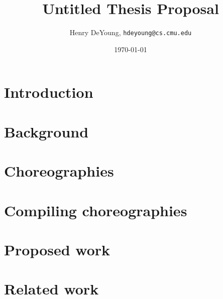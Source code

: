 \documentclass{article}
\begin{document}
\title{Untitled Thesis Proposal}
\author{Henry DeYoung, \texttt{hdeyoung@cs.cmu.edu}}
\date{\today}
\maketitle

\section{Introduction}\label{sec:introduction}



\section{Background}\label{sec:background}



\section{Choreographies}\label{sec:choreographies}



\section{Compiling choreographies}\label{sec:compile-choreo}



\section{Proposed work}\label{sec:extensions}



\section{Related work}\label{sec:related-work}



\printbibliography
\end{document}
